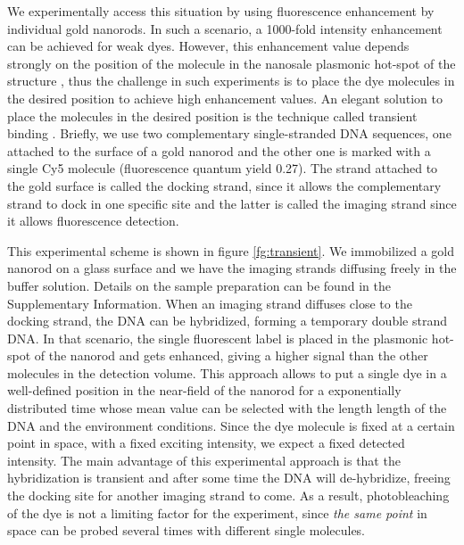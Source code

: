We experimentally access this situation by using fluorescence enhancement
by individual gold nanorods. In such a scenario, 
a 1000-fold intensity enhancement can be achieved for weak 
dyes\cite{yuan2013thousandfold,khatua2014resonant}. However, this enhancement value
depends strongly on the position of the molecule in the nanosale plasmonic 
hot-spot of the structure \cite{khatua2014resonant}, thus the challenge in 
such experiments is to place the dye molecules in the desired position to 
achieve high enhancement values. An elegant solution to place the molecules 
in the desired position is the technique called transient binding \cite{acuna2012fluorescence}.
Briefly, we use two complementary single-stranded DNA sequences, one attached
 to the surface of a gold nanorod and the other one is marked with a single Cy5
 molecule (fluorescence quantum yield 0.27). The strand attached to the gold 
surface is  called the docking strand, since it allows the complementary strand 
to dock in one specific site and the latter is called the imaging strand since 
it allows fluorescence detection. 

This experimental scheme is shown in figure \ref{fg:transient}. We immobilized 
a gold nanorod on a glass surface and we have the imaging strands diffusing 
freely in the buffer solution. Details on the sample preparation can be found 
in the Supplementary Information. When an imaging strand diffuses close to the 
docking strand, the DNA can be hybridized, forming a temporary double strand DNA. 
In that scenario, the single fluorescent label is placed in the plasmonic 
hot-spot of the nanorod and gets enhanced, giving a higher signal than the 
other molecules in the detection volume. 
This approach allows to put a single dye in a well-defined position in the 
near-field of the nanorod for a exponentially distributed time whose 
mean value can be selected with the length length of the DNA and the 
environment conditions. Since the dye molecule is fixed at a 
certain point in space, with a fixed exciting intensity, we expect a 
fixed detected intensity. The main advantage of this experimental 
approach is that the hybridization is transient and after some time 
the DNA will de-hybridize, freeing the docking site for another 
imaging strand to come. As a result, photobleaching of the dye 
is not a limiting factor for the experiment, since \textit{the same point} 
in space can be probed several times with different single molecules.

